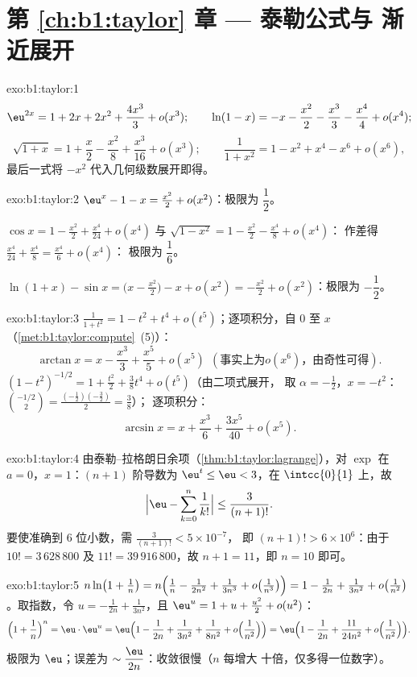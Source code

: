 \section*{第 \ref{ch:b1:taylor} 章 --- 泰勒公式与
渐近展开}

\begin{solution}{exo:b1:taylor:1}
\[
\eu^{2x} = 1 + 2x + 2x^2 + \frac{4x^3}{3} + o(x^3);
\qquad
\ln(1 - x) = -x - \frac{x^2}{2} - \frac{x^3}{3} - \frac{x^4}{4} +
o(x^4);
\]
\[
\sqrt{1+x} = 1 + \frac x2 - \frac{x^2}{8} + \frac{x^3}{16} + o(x^3);
\qquad
\frac{1}{1 + x^2} = 1 - x^2 + x^4 - x^6 + o(x^6),
\]
最后一式将 $-x^2$ 代入几何级数展开即得。
\end{solution}

\begin{solution}{exo:b1:taylor:2}
$\eu^x - 1 - x = \frac{x^2}{2} + o(x^2)$：极限为 $\dfrac12$。

$\cos x = 1 - \frac{x^2}{2} + \frac{x^4}{24} + o(x^4)$ 与
$\sqrt{1 - x^2} = 1 - \frac{x^2}{2} - \frac{x^4}{8} + o(x^4)$：
作差得 $\frac{x^4}{24} + \frac{x^4}{8} = \frac{x^4}{6} + o(x^4)$：
极限为 $\dfrac16$。

$\ln(1+x) - \sin x = \bigl(x - \frac{x^2}{2}\bigr) - x + o(x^2) =
-\frac{x^2}{2} + o(x^2)$：极限为 $-\dfrac12$。
\end{solution}

\begin{solution}{exo:b1:taylor:3}
$\frac{1}{1+t^2} = 1 - t^2 + t^4 + o(t^5)$；逐项积分，自 $0$ 至
$x$（\cref{met:b1:taylor:compute}~(5)）：
\[
\arctan x = x - \frac{x^3}{3} + \frac{x^5}{5} + o(x^5)\ \ (\text{事实上为
}o(x^6)\text{，由奇性可得}).
\]
$(1 - t^2)^{-1/2} = 1 + \frac{t^2}{2} + \frac38 t^4 + o(t^5)$（由二项式展开，
取 $\alpha = -\frac12$，$x = -t^2$：
$\binom{-1/2}{2} = \frac{(-\frac12)(-\frac32)}{2} = \frac38$）；
逐项积分：
\[
\arcsin x = x + \frac{x^3}{6} + \frac{3x^5}{40} + o(x^5) .
\]
\end{solution}

\begin{solution}{exo:b1:taylor:4}
由泰勒–拉格朗日余项（\cref{thm:b1:taylor:lagrange}），对 $\exp$ 在 $a =
0$，$x = 1$：$(n+1)$ 阶导数为 $\eu^t \leq \eu < 3$，在
$\intcc{0}{1}$ 上，故
\[
\Bigl|\eu - \sum_{k=0}^{n} \frac{1}{k!}\Bigr| \leq
\frac{3}{(n+1)!} .
\]
要使准确到 $6$ 位小数，需 $\frac{3}{(n+1)!} < 5\times 10^{-7}$，
即 $(n+1)! > 6\times 10^{6}$：由于 $10! = 3\,628\,800$ 及 $11! =
39\,916\,800$，故 $n + 1 = 11$，即 $n = 10$ 即可。
\end{solution}

\begin{solution}{exo:b1:taylor:5}
$n\ln\bigl(1 + \frac1n\bigr) = n\Bigl(\frac1n - \frac{1}{2n^2} +
\frac{1}{3n^3} + o\bigl(\frac{1}{n^3}\bigr)\Bigr) = 1 - \frac{1}{2n}
+ \frac{1}{3n^2} + o\bigl(\frac{1}{n^2}\bigr)$。取指数，令
$u = -\frac{1}{2n} + \frac{1}{3n^2}$，且 $\eu^u = 1 + u + \frac{u^2}2
+ o(u^2)$：
\[
\Bigl(1 + \frac1n\Bigr)^n = \eu\cdot \eu^{u}
= \eu\Bigl(1 - \frac{1}{2n} + \frac{1}{3n^2} + \frac{1}{8n^2}
+ o\Bigl(\frac{1}{n^2}\Bigr)\Bigr)
= \eu\Bigl(1 - \frac{1}{2n} + \frac{11}{24n^2} +
o\Bigl(\frac{1}{n^2}\Bigr)\Bigr).
\]
极限为 $\eu$；误差为 $\sim \dfrac{\eu}{2n}$：收敛很慢（$n$ 每增大
十倍，仅多得一位数字）。
\end{solution}

